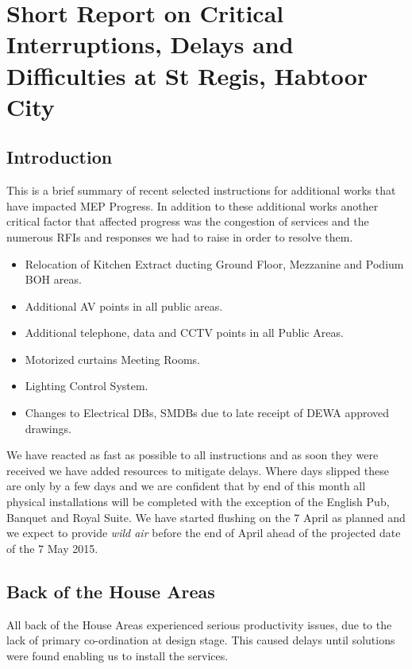 
\chapter{Short Report on Critical Interruptions, Delays and Difficulties at St Regis, Habtoor City}

\section{Introduction}

This is a brief summary of recent selected instructions for additional works that have impacted  MEP Progress. 
In addition to these additional works another critical factor that affected progress was the congestion of services and the numerous RFIs and responses we had to raise in order to resolve them.

\begin{itemize}
\item Relocation of Kitchen Extract ducting Ground Floor, Mezzanine and Podium BOH areas.
\item  Additional AV points in all public areas.
\item  Additional telephone, data and CCTV points in all Public Areas.
\item  Motorized curtains Meeting Rooms.
\item Lighting Control System.
\item Changes to Electrical DBs, SMDBs due to late receipt of DEWA approved drawings.
\end{itemize}

We have reacted as fast as possible to all instructions and as soon they were received we have added resources to mitigate delays. Where days slipped these are only by a few days and we are confident that by end of this month all physical installations will be completed with the exception of the English Pub, Banquet and Royal Suite. We have started flushing on the 7 April as planned and we expect to provide \emph{wild air} before the end of April ahead of the projected date of the 7 May 2015.

\section{Back of the House Areas}

All back of the House Areas experienced serious productivity issues, due to the lack of primary co-ordination at design stage. This caused delays until solutions were found enabling us to install the services.

